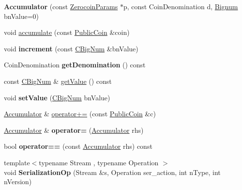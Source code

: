 \begin{DoxyCompactItemize}
{\bfseries Accumulator} (const \mbox{\hyperlink{classlibzerocoin_1_1_zerocoin_params}{Zerocoin\+Params}} $\ast$p, const Coin\+Denomination d, \mbox{\hyperlink{class_c_big_num}{Bignum}} bn\+Value=0)
\item 
void \mbox{\hyperlink{classlibzerocoin_1_1_accumulator_aa58ff4676bd84dea150ae40abd489024}{accumulate}} (const \mbox{\hyperlink{classlibzerocoin_1_1_public_coin}{Public\+Coin}} \&coin)
\item 
\mbox{\label{classlibzerocoin_1_1_accumulator_a5f5c7d29420789bd7945972f99de2b9b}} 
void {\bfseries increment} (const \mbox{\hyperlink{class_c_big_num}{C\+Big\+Num}} \&bn\+Value)
\item 
\mbox{\label{classlibzerocoin_1_1_accumulator_a12164dbcbff4433c3eb7cbfb7c2beb70}} 
Coin\+Denomination {\bfseries get\+Denomination} () const
\item 
const \mbox{\hyperlink{class_c_big_num}{C\+Big\+Num}} \& \mbox{\hyperlink{classlibzerocoin_1_1_accumulator_abe9f6281164864e8cd7ca48ad8a7bd18}{get\+Value}} () const
\item 
\mbox{\label{classlibzerocoin_1_1_accumulator_a8f2f2ca8a8f1f58419ba37a40874a782}} 
void {\bfseries set\+Value} (\mbox{\hyperlink{class_c_big_num}{C\+Big\+Num}} bn\+Value)
\item 
\mbox{\hyperlink{classlibzerocoin_1_1_accumulator}{Accumulator}} \& \mbox{\hyperlink{classlibzerocoin_1_1_accumulator_a03bec513778240e9ddfcd2103524fd33}{operator+=}} (const \mbox{\hyperlink{classlibzerocoin_1_1_public_coin}{Public\+Coin}} \&c)
\item 
\mbox{\label{classlibzerocoin_1_1_accumulator_aa7e3daef94f3096ccddb10b894fc5628}} 
\mbox{\hyperlink{classlibzerocoin_1_1_accumulator}{Accumulator}} \& {\bfseries operator=} (\mbox{\hyperlink{classlibzerocoin_1_1_accumulator}{Accumulator}} rhs)
\item 
\mbox{\label{classlibzerocoin_1_1_accumulator_a4cf1fca9bd6cde051a93c714912c911d}} 
bool {\bfseries operator==} (const \mbox{\hyperlink{classlibzerocoin_1_1_accumulator}{Accumulator}} rhs) const
\item 
\mbox{\label{classlibzerocoin_1_1_accumulator_ab8393febcee1c49ed90a7c297f9370d0}} 
{\footnotesize template$<$typename Stream , typename Operation $>$ }\\void {\bfseries Serialization\+Op} (Stream \&s, Operation ser\+\_\+action, int n\+Type, int n\+Version)
\end{DoxyCompactItemize}
